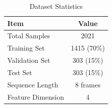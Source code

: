 
\begin{table}[h]
\centering
\caption{Dataset Statistics}
\label{tab:dataset}
\begin{tabular}{lc}
\hline
\textbf{Item} & \textbf{Value} \\
\hline
Total Samples & 2021 \\
Training Set & 1415 (70\%) \\
Validation Set & 303 (15\%) \\
Test Set & 303 (15\%) \\
Sequence Length & 8 frames \\
Feature Dimension & 4 \\
\hline
\end{tabular}
\end{table}
